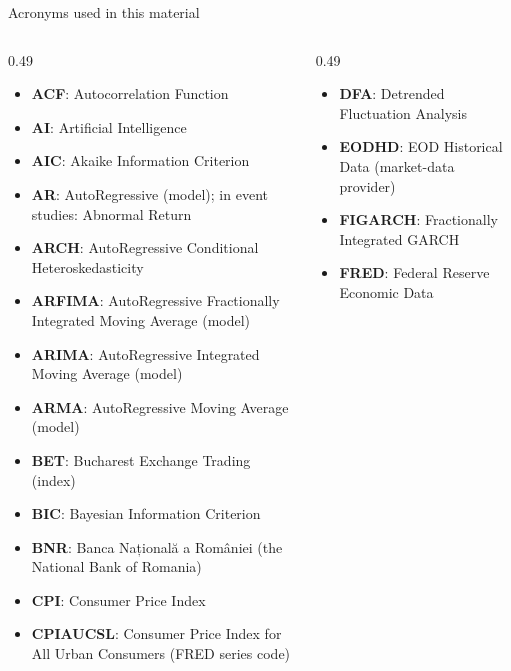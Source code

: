{
\begin{frame}[noframenumbering]
    \titlepage
\end{frame}
}
\begin{frame}{Acronyms used in this material}
\begin{columns}[T]
\begin{column}{0.49\textwidth}
\begin{itemize}\setlength{\itemsep}{0pt}
    \item \textbf{ACF}: Autocorrelation Function
    \item \textbf{AI}: Artificial Intelligence
    \item \textbf{AIC}: Akaike Information Criterion
    \item \textbf{AR}: AutoRegressive (model); in event studies: Abnormal Return
    \item \textbf{ARCH}: AutoRegressive Conditional Heteroskedasticity
    \item \textbf{ARFIMA}: AutoRegressive Fractionally Integrated Moving Average (model)
    \item \textbf{ARIMA}: AutoRegressive Integrated Moving Average (model)
    \item \textbf{ARMA}: AutoRegressive Moving Average (model)
    \item \textbf{BET}: Bucharest Exchange Trading (index)
    \item \textbf{BIC}: Bayesian Information Criterion
    \item \textbf{BNR}: Banca Națională a României (the National Bank of Romania)
    \item \textbf{CPI}: Consumer Price Index
    \item \textbf{CPIAUCSL}: Consumer Price Index for All Urban Consumers (FRED series code)
\end{itemize}
\end{column}
\begin{column}{0.49\textwidth}
\begin{itemize}\setlength{\itemsep}{0pt}
    \item \textbf{DFA}: Detrended Fluctuation Analysis
    \item \textbf{EODHD}: EOD Historical Data (market-data provider)
    \item \textbf{FIGARCH}: Fractionally Integrated GARCH
    \item \textbf{FRED}: Federal Reserve Economic Data

\end{itemize}
\end{column}
\end{columns}
\end{frame}
